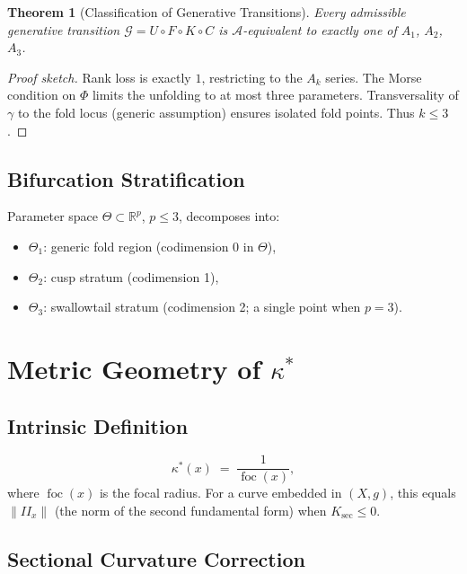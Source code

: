 \documentclass[12pt, oneside]{book}
\theoremstyle{plain}
\newtheorem{theorem}{Theorem}[section]
\theoremstyle{definition}
\theoremstyle{remark}
\begin{document}
\begin{theorem}[Classification of Generative Transitions]
Every admissible generative transition $\mathcal{G} = U \circ F \circ
K \circ C$ is $\mathcal{A}$-equivalent to exactly one of $A_1$,
$A_2$, $A_3$.
\end{theorem}

\begin{proof}[Proof sketch]
Rank loss is exactly $1$, restricting to the $A_k$ series. The Morse
condition on $\Phi$ limits the unfolding to at most three parameters.
Transversality of $\gamma$ to the fold locus (generic assumption)
ensures isolated fold points. Thus $k \le 3$.
\end{proof}

\subsection{Bifurcation Stratification}

Parameter space $\Theta \subset \mathbb{R}^p$, $p \le 3$, decomposes
into:
\begin{itemize}
\item $\Theta_1$: generic fold region (codimension 0 in $\Theta$),
\item $\Theta_2$: cusp stratum (codimension 1),
\item $\Theta_3$: swallowtail stratum
  (codimension 2; a single point when $p=3$).
\end{itemize}

\section{Metric Geometry of \texorpdfstring{$\kappa^*$}{kappa*}}
\label{sec:metric}

\subsection{Intrinsic Definition}

\[
\kappa^*(x) \;=\; \frac{1}{\operatorname{foc}(x)},
\]
where $\operatorname{foc}(x)$ is the focal radius. For a curve
embedded in $(X,g)$, this equals $\|II_x\|$ (the norm of the second
fundamental form) when $K_{\mathrm{sec}} \le 0$.

\subsection{Sectional Curvature Correction}
\end{document}

